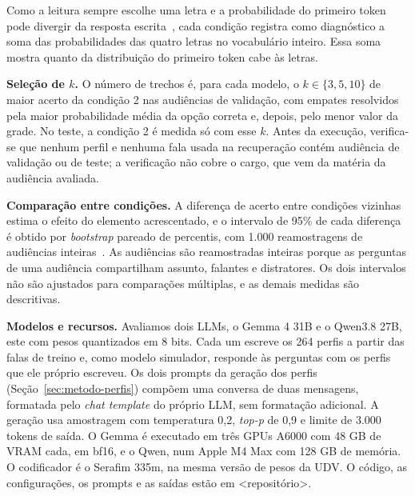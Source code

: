 Como a leitura sempre escolhe uma letra e a probabilidade do primeiro token pode divergir da
resposta escrita~\citep{wang2024answer}, cada condição registra como diagnóstico a soma das
probabilidades das quatro letras no vocabulário inteiro. Essa soma mostra quanto da distribuição do
primeiro token cabe às letras.

\textbf{Seleção de $k$.} O número de trechos é, para cada modelo, o $k \in \{3, 5, 10\}$ de maior
acerto da condição 2 nas audiências de validação, com empates resolvidos pela maior probabilidade média da opção correta
e, depois, pelo menor valor da grade. No teste, a condição 2 é medida só com esse $k$. Antes da
execução, verifica-se que nenhum perfil e nenhuma fala usada na recuperação contém audiência de
validação ou de teste; a verificação não cobre o cargo, que vem da matéria da audiência avaliada.

\textbf{Comparação entre condições.} A diferença de acerto entre condições vizinhas estima o efeito
do elemento acrescentado, e o intervalo de 95\% de cada diferença é obtido por \textit{bootstrap}
pareado de percentis, com 1.000 reamostragens de audiências inteiras~\citep{efron1993introduction}.
As audiências são reamostradas inteiras porque as perguntas de uma audiência compartilham assunto,
falantes e distratores. Os dois intervalos não são ajustados para comparações múltiplas, e as demais
medidas são descritivas.

\textbf{Modelos e recursos.} Avaliamos dois LLMs, o Gemma 4 31B e o Qwen3.8 27B, este com pesos
quantizados em 8 bits. Cada um escreve os 264 perfis a partir das falas de treino e, como modelo simulador, responde às
perguntas com os perfis que ele próprio escreveu. Os dois prompts da geração dos perfis
(Seção~\ref{sec:metodo-perfis}) compõem uma conversa de duas mensagens, formatada pelo \textit{chat
template} do próprio LLM, sem formatação adicional. A geração usa amostragem com temperatura 0,2,
\textit{top-p} de 0,9 e limite de 3.000 tokens de saída. O Gemma é executado em três GPUs A6000 com
48 GB de VRAM cada, em bf16, e o Qwen, num Apple M4 Max com 128 GB de memória. O codificador é o Serafim
335m, na mesma versão de pesos da UDV. O código, as configurações, os prompts e as saídas estão em
<repositório>.
